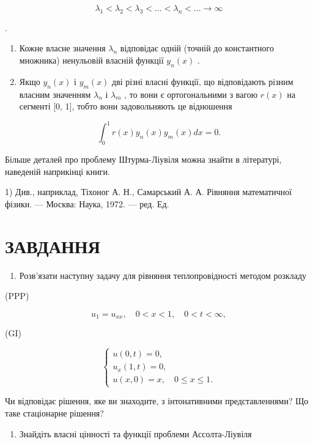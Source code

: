 \documentclass[
  ukrainian,
]{article}
\providecommand{\tightlist}{%
  \setlength{\itemsep}{0pt}\setlength{\parskip}{0pt}}
\begin{document}
\[
\lambda_1 < \lambda_2 < \lambda_3 < \ldots < \lambda_n < \ldots \to \infty
\]

.

\begin{enumerate}
\def\labelenumi{\arabic{enumi}.}
\setcounter{enumi}{1}
\item
  Кожне власне значення \(\lambda_n\) відповідає одній (точній до
  константного множника) ненульовій власній функції \(y_n(x)\) .
\item
  Якщо \(y_n(x)\) і \(y_m(x)\) дві різні власні функції, що відповідають
  різним власним значенням \(\lambda_n\) і \(\lambda_m\) , то вони є
  ортогональними з вагою \(r(x)\) на сегменті {[}0, 1{]}, тобто вони
  задовольняють це відношення
\end{enumerate}

\[
\int_{0}^{1} r(x) y_{n}(x) y_{m}(x) dx = 0.
\]

Більше деталей про проблему Штурма-Ліувіля можна знайти в літературі,
наведеній наприкінці книги.

1) Див., наприклад, Тіхоног А. Н., Самарський А. А. Рівняння
математичної фізики. --- Москва: Наука, 1972. --- ред. Ед.

\section{ЗАВДАННЯ}\label{ux437ux430ux432ux434ux430ux43dux43dux44f-6}

\begin{enumerate}
\def\labelenumi{\arabic{enumi}.}
\tightlist
\item
  Розв'язати наступну задачу для рівняння теплопровідності методом
  розкладу
\end{enumerate}

(PPP)

\[
u_1 = u_{xx}, \quad 0 < x < 1, \quad 0 < t < \infty,
\]

(GI)

\[
\begin{cases} u(0, t) = 0, \\ u_x(1, t) = 0, \\ u(x, 0) = x, \quad 0 \le x \le 1. \end{cases}
\]

Чи відповідає рішення, яке ви знаходите, з інтонативними
представленнями? Що таке стаціонарне рішення?

\begin{enumerate}
\def\labelenumi{\arabic{enumi}.}
\setcounter{enumi}{1}
\tightlist
\item
  Знайдіть власні цінності та функції проблеми Ассолта-Ліувіля
\end{enumerate}
\end{document}

